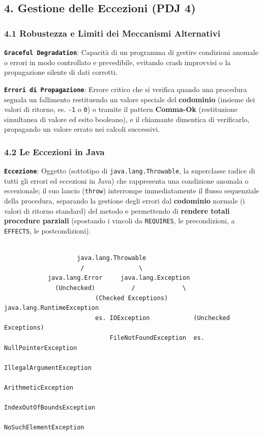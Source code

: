 \subsection{4. Gestione delle Eccezioni (PDJ 4)}\label{4-gestione-delle-eccezioni-pdj-4}

\subsubsection{4.1 Robustezza e Limiti dei Meccanismi Alternativi}\label{4-1-robustezza-e-limiti-dei-meccanismi-alternativi}

\textbf{\texttt{Graceful Degradation}}: Capacità di un programma di gestire condizioni anomale o errori in modo controllato e prevedibile, evitando crash improvvisi o la propagazione silente di dati corrotti.

\textbf{\texttt{Errori di Propagazione}}: Errore critico che si verifica quando una procedura segnala un fallimento restituendo un valore speciale del \textbf{codominio} (insieme dei valori di ritorno, es. \texttt{-1} o \texttt{0}) o tramite il pattern \textbf{Comma-Ok} (restituzione simultanea di valore ed esito booleano), e il chiamante dimentica di verificarlo, propagando un valore errato nei calcoli successivi.

\subsubsection{4.2 Le Eccezioni in Java}\label{4-2-le-eccezioni-in-java}

\textbf{\texttt{Eccezione}}: Oggetto (sottotipo di \texttt{java.lang.Throwable}, la superclasse radice di tutti gli errori ed eccezioni in Java) che rappresenta una condizione anomala o eccezionale; il suo lancio (\texttt{throw}) interrompe immediatamente il flusso sequenziale della procedura, separando la gestione degli errori dal \textbf{codominio} normale (i valori di ritorno standard) del metodo e permettendo di \textbf{rendere totali procedure parziali} (spostando i vincoli da \texttt{REQUIRES}, le precondizioni, a \texttt{EFFECTS}, le postcondizioni).

\begin{lstlisting}[basicstyle=\ttfamily\scriptsize,breaklines=true,columns=flexible]

                    java.lang.Throwable
                     /               \
            java.lang.Error     java.lang.Exception
              (Unchecked)          /             \
                         (Checked Exceptions)   java.lang.RuntimeException
                         es. IOException            (Unchecked Exceptions)
                             FileNotFoundException  es. NullPointerException
                                                        IllegalArgumentException
                                                        ArithmeticException
                                                        IndexOutOfBoundsException
                                                        NoSuchElementException


\end{lstlisting}

